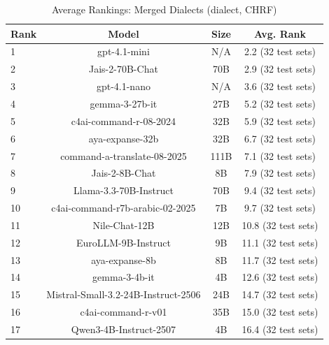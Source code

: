 \begin{table}[htbp]
\centering
\caption{Average Rankings: Merged Dialects (dialect, CHRF)}
\label{tab:avg_rankings_chrf_dialect}
\begin{tabular}{l@{\hspace{3pt}}c@{\hspace{3pt}}c@{\hspace{3pt}}c}
\toprule
Rank & Model & Size & Avg. Rank \\
\midrule
1 & gpt-4.1-mini & N/A & 2.2 (32 test sets) \\
2 & Jais-2-70B-Chat & 70B & 2.9 (32 test sets) \\
3 & gpt-4.1-nano & N/A & 3.6 (32 test sets) \\
4 & gemma-3-27b-it & 27B & 5.2 (32 test sets) \\
5 & c4ai-command-r-08-2024 & 32B & 5.9 (32 test sets) \\
6 & aya-expanse-32b & 32B & 6.7 (32 test sets) \\
7 & command-a-translate-08-2025 & 111B & 7.1 (32 test sets) \\
8 & Jais-2-8B-Chat & 8B & 7.9 (32 test sets) \\
9 & Llama-3.3-70B-Instruct & 70B & 9.4 (32 test sets) \\
10 & c4ai-command-r7b-arabic-02-2025 & 7B & 9.7 (32 test sets) \\
11 & Nile-Chat-12B & 12B & 10.8 (32 test sets) \\
12 & EuroLLM-9B-Instruct & 9B & 11.1 (32 test sets) \\
13 & aya-expanse-8b & 8B & 11.7 (32 test sets) \\
14 & gemma-3-4b-it & 4B & 12.6 (32 test sets) \\
15 & Mistral-Small-3.2-24B-Instruct-2506 & 24B & 14.7 (32 test sets) \\
16 & c4ai-command-r-v01 & 35B & 15.0 (32 test sets) \\
17 & Qwen3-4B-Instruct-2507 & 4B & 16.4 (32 test sets) \\
\bottomrule
\end{tabular}
\end{table}